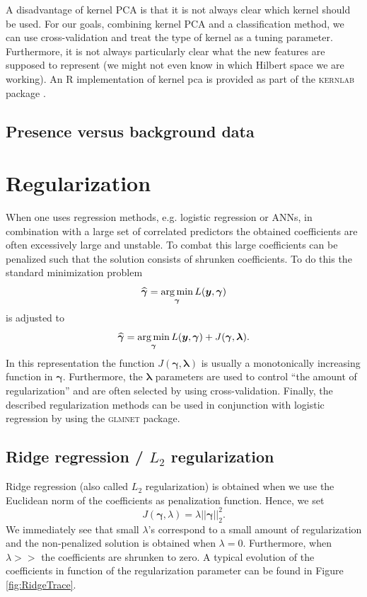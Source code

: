 A disadvantage of kernel PCA is that it is not always clear which kernel should be used. For our goals, combining kernel PCA and a classification method, we can use cross-validation and treat the type of kernel as a tuning parameter. Furthermore, it is not always particularly clear what the new features are supposed to represent (we might not even know in which Hilbert space we are working). An R implementation of kernel pca is provided as part of the \textsc{kernlab} package \parencite{kernlab}.

\subsection{Presence versus background data}
\label{sec:dimRedPrVSBG}


\section{Regularization}
\label{sec:Regularization}
When one uses regression methods, e.g. logistic regression or ANNs, in combination with a large set of correlated predictors the obtained coefficients are often excessively large and unstable. To combat this large coefficients can be penalized such that the solution consists of shrunken coefficients. To do this the standard minimization problem
\[\widehat{\bm{\gamma}} = \operatorname*{arg\,min}_{\bm{\gamma}} L(\bm{y},\bm{\gamma})\]
is adjusted to \[\widehat{\bm{\gamma}} = \operatorname*{arg\,min}_{\bm{\gamma}} L(\bm{y},\bm{\gamma}) + J(\bm{\gamma},\bm{\lambda}).\]
In this representation the function $ J(\bm{\gamma},\bm{\lambda})$ is usually a monotonically increasing function in $\bm{\gamma}$. Furthermore, the $\bm{\lambda}$ parameters are used to control ``the amount of regularization'' and are often selected by using cross-validation. Finally, the described regularization methods can be used in conjunction with logistic regression by using the \textsc{glmnet} \parencite{glmnet} package.

\label{sec:Regularization}
\subsection{Ridge regression / $L_2$ regularization}
\label{sec:L2Regularization}
Ridge regression (also called $L_2$ regularization) is obtained when we use the Euclidean norm of the coefficients as penalization function. Hence, we set 
\[J(\bm{\gamma},\lambda) = \lambda \vert \vert \bm{\gamma} \vert \vert ^2 _2.\]
We immediately see that small $\lambda$'s correspond to a small amount of regularization and the non-penalized solution is obtained when $\lambda = 0.$ Furthermore, when $\lambda >>$ the coefficients are shrunken to zero. A typical evolution of the coefficients in function of the regularization parameter can be found in Figure \ref{fig:RidgeTrace}.\\ 

